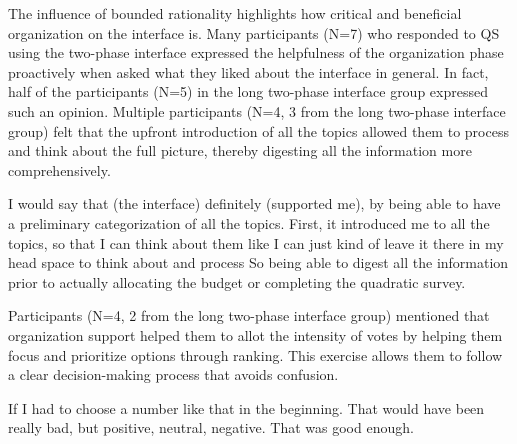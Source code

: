     

The influence of bounded rationality highlights how critical and beneficial organization on the interface is. Many participants (N=7) who responded to QS using the two-phase interface expressed the helpfulness of the organization phase proactively when asked what they liked about the interface in general. In fact, half of the participants (N=5) in the long two-phase interface group expressed such an opinion. Multiple participants (N=4, 3 from the long two-phase interface group) felt that the upfront introduction of all the topics allowed them to process and think about the full picture, thereby digesting all the information more comprehensively. 

\begin{displayquote}
I would say that (the interface) definitely (supported me), by being able to have a preliminary categorization of all the topics. First, it introduced me to all the topics, so that I can think about them like I can just kind of leave it there in my head space to think about and process \bracketellipsis So being able to digest all the information prior to actually allocating the budget or completing the quadratic survey. \hfill{}
\end{displayquote}

Participants (N=4, 2 from the long two-phase interface group) mentioned that organization support helped them to allot the intensity of votes by helping them focus and prioritize options through ranking. This exercise allows them to follow a clear decision-making process that avoids confusion.

\begin{displayquote}
If I had to choose a number like that in the beginning. That would have been really bad, but positive, neutral, negative. That was good enough. \hfill{}
\end{displayquote}

